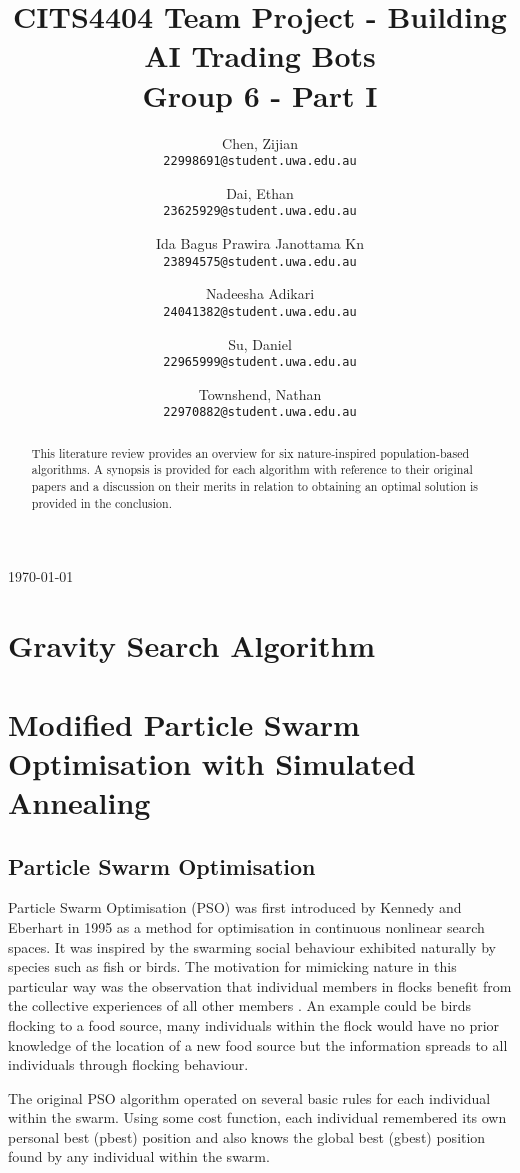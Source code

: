 \documentclass[a4paper, 12pt]{extarticle}
\title{
    CITS4404 Team Project - Building AI Trading Bots
    \\ \large Group 6 - Part I 
}
\author{
    Chen, Zijian\\
    \normalsize \texttt{22998691@student.uwa.edu.au}
    \and
    Dai, Ethan\\
    \normalsize \texttt{23625929@student.uwa.edu.au}
    \and
    Ida Bagus Prawira Janottama Kn\\
    \normalsize \texttt{23894575@student.uwa.edu.au}
    \and
    Nadeesha Adikari\\
    \normalsize \texttt{24041382@student.uwa.edu.au}
    \and
    Su, Daniel\\
    \normalsize \texttt{22965999@student.uwa.edu.au}
    \and
    Townshend, Nathan\\
    \normalsize \texttt{22970882@student.uwa.edu.au}
}
\date{}
\begin{document}
\maketitle

\begin{abstract}
    \noindent
    This literature review provides an overview for six nature-inspired population-based algorithms. A synopsis is provided for each algorithm with reference to their original papers and a discussion on their merits in relation to obtaining an optimal solution is provided in the conclusion.
\end{abstract}

\vfill

\begin{center}
    \today
\end{center}


\newpage
\tableofcontents



\newpage
\section{Gravity Search Algorithm}\label{sec:alg:gsa}


\newpage
\section{Modified Particle Swarm Optimisation with Simulated Annealing}\label{sec:alg:sa-pso}

\subsection{Particle Swarm Optimisation}

Particle Swarm Optimisation (PSO) was first introduced by Kennedy and Eberhart \cite{kennedy1995particle} in 1995 as a method for optimisation in continuous nonlinear search spaces. It was inspired by the swarming social behaviour exhibited naturally by species such as fish or birds. The motivation for mimicking nature in this particular way was the observation that individual members in flocks benefit from the collective experiences of all other members \cite{wilson2000sociobiology}. An example could be birds flocking to a food source, many individuals within the flock would have no prior knowledge of the location of a new food source but the information spreads to all individuals through flocking behaviour. 

The original PSO algorithm operated on several basic rules for each individual within the swarm. Using some cost function, each individual remembered its own personal best (pbest) position and also knows the global best (gbest) position found by any individual within the swarm.
\end{document}
